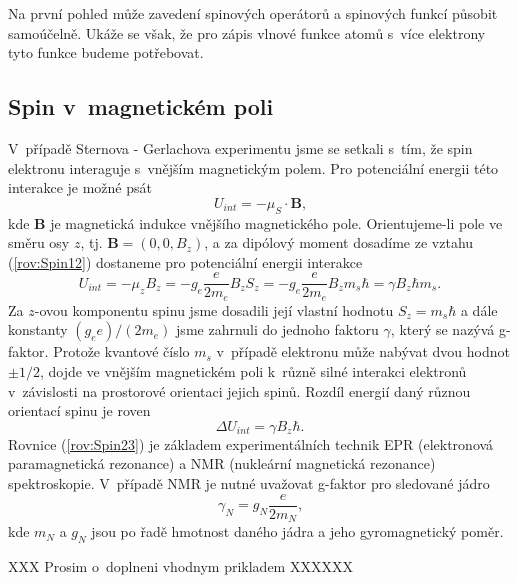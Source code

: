 Na první pohled může zavedení spinových operátorů a spinových funkcí působit samoúčelně. Ukáže se však, že pro zápis vlnové funkce atomů s~více elektrony tyto funkce budeme potřebovat.



\subsection{Spin v~magnetickém poli}
\label{kap:SpinMagPole}

V~případě Sternova - Gerlachova experimentu jsme se setkali s~tím, že spin elektronu interaguje s~vnějším magnetickým polem. Pro potenciální energii této interakce je možné psát
\begin{equation}
U_{int} = - \mu_S \cdot \mathbf{B} \mbox{,}
\label{rov:Spin21}
\end{equation}
kde $\mathbf{B}$ je magnetická indukce vnějšího magnetického pole. Orientujeme-li pole ve směru osy $z$, tj. $\mathbf{B}=(0, 0, B_z)$, a za dipólový moment dosadíme ze vztahu (\ref{rov:Spin12}) dostaneme pro potenciální energii interakce
\begin{equation}
U_{int} = -\mu_z B_z = -g_e \frac{e}{2m_e} B_z S_z = -g_e \frac{e}{2m_e} B_z  m_s \hbar  = \gamma B_z \hbar m_s \mbox{.}
\label{rov:Spin22}
\end{equation}
Za $z$-ovou komponentu spinu jsme dosadili její vlastní hodnotu $S_z = m_s \hbar$ a dále konstanty $(g_e e)/(2m_e)$ jsme zahrnuli do jednoho faktoru $\gamma$, který se nazývá g-faktor. Protože kvantové číslo $m_s$ v~případě elektronu může nabývat dvou hodnot $\pm 1/2$, dojde ve vnějším magnetickém poli k~různě silné interakci elektronů v~závislosti na prostorové orientaci jejich spinů. Rozdíl energií daný různou orientací spinu je roven
\begin{equation}
\Delta U_{int} = \gamma B_z \hbar \mbox{.}
\label{rov:Spin23}
\end{equation}
Rovnice (\ref{rov:Spin23}) je základem experimentálních technik EPR (elektronová paramagnetická rezonance) a NMR (nukleární magnetická rezonance) spektroskopie. V~případě NMR je nutné uvažovat g-faktor pro sledované jádro
\begin{equation}
\gamma_N = g_N \frac{e}{2m_N} \mbox{,}
\label{rov:Spin24}
\end{equation}
kde $m_N$ a $g_N$ jsou po řadě hmotnost daného jádra a jeho gyromagnetický poměr.


XXX
Prosim o~doplneni vhodnym prikladem
XXXXXX

